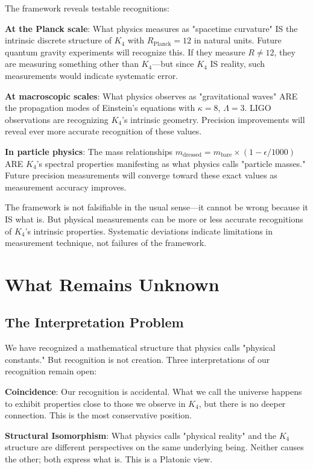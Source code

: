 \documentclass[11pt,a4paper]{book}
\begin{document}
The framework reveals testable recognitions:

\textbf{At the Planck scale}: What physics measures as "spacetime curvature" IS the intrinsic discrete structure of $K_4$ with $R_{\text{Planck}} = 12$ in natural units. Future quantum gravity experiments will recognize this. If they measure $R \neq 12$, they are measuring something other than $K_4$—but since $K_4$ IS reality, such measurements would indicate systematic error.

\textbf{At macroscopic scales}: What physics observes as "gravitational waves" ARE the propagation modes of Einstein's equations with $\kappa = 8$, $\Lambda = 3$. LIGO observations are recognizing $K_4$'s intrinsic geometry. Precision improvements will reveal ever more accurate recognition of these values.

\textbf{In particle physics}: The mass relationships $m_{\text{dressed}} = m_{\text{bare}} \times (1 - \epsilon/1000)$ ARE $K_4$'s spectral properties manifesting as what physics calls "particle masses." Future precision measurements will converge toward these exact values as measurement accuracy improves.

The framework is not falsifiable in the usual sense—it cannot be wrong because it IS what is. But physical measurements can be more or less accurate recognitions of $K_4$'s intrinsic properties. Systematic deviations indicate limitations in measurement technique, not failures of the framework.

\chapter{What Remains Unknown}

\section{The Interpretation Problem}

We have recognized a mathematical structure that physics calls "physical constants." But recognition is not creation. Three interpretations of our recognition remain open:

\textbf{Coincidence}: Our recognition is accidental. What we call the universe happens to exhibit properties close to those we observe in $K_4$, but there is no deeper connection. This is the most conservative position.

\textbf{Structural Isomorphism}: What physics calls "physical reality" and the $K_4$ structure are different perspectives on the same underlying being. Neither causes the other; both express what is. This is a Platonic view.
\end{document}
